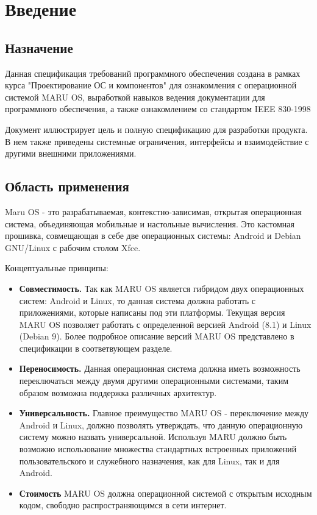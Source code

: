 \documentclass[a4paper, 14pt]{article}
\begin{document}




\section{Введение}

\subsection{Назначение}
\par Данная спецификация требований программного обеспечения создана в рамках курса "Проектирование ОС и компонентов" для ознакомления с операционной системой MARU OS, выработкой навыков ведения документации для программного обеспечения, а также ознакомлением со стандартом IEEE 830-1998
\par Документ иллюстрирует цель и полную спецификацию для разработки продукта. В нем также приведены системные ограничения, интерфейсы и взаимодействие с другими внешними приложениями.


\subsection{Область применения}
\par Maru OS - это разрабатываемая, контекстно-зависимая, открытая операционная система, объединяющая мобильные и настольные вычисления. Это кастомная прошивка, совмещающая в себе две операционных системы: Android и Debian GNU/Linux с рабочим столом Xfce.

\par Концептуальные принципы:
\begin{itemize}
    \item \textbf{Совместимость.} 
Так как MARU OS является гибридом двух операционных систем: Android и Linux, то данная система должна работать с приложениями, которые написаны под эти платформы. Текущая версия MARU OS позволяет работать с определенной версией Android (8.1) и Linux (Debian 9). Более подробное описание версий MARU OS представлено в спецификации в соответвующем разделе.
    \item \textbf{Переносимость.} 
Данная операционная система должна иметь возможность переключаться между двумя другими операционными системами, таким образом возможна поддержка различных архитектур.
    \item \textbf{Универсальность.}
Главное преимущество MARU OS - переключение между Android и Linux, должно позволять утверждать, что данную операционную систему можно назвать универсальной. Используя MARU должно быть возможно использование множества стандартных встроенных приложений пользовательского и служебного назначения, как для Linux, так и для Android.
    \item \textbf{Стоимость}
MARU OS должна операционной системой с открытым исходным кодом, свободно распространяющимся в сети интернет.
\end{itemize}
\end{document}
